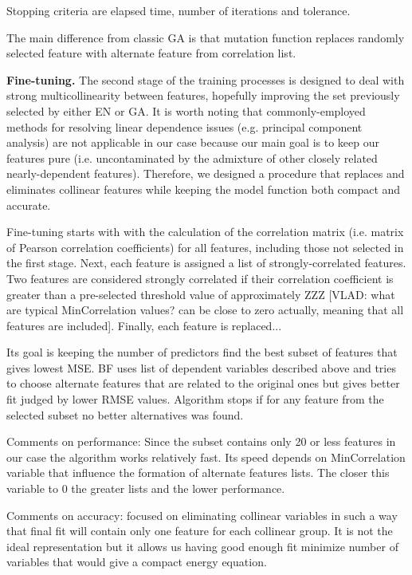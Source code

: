 \documentclass[aps,prl,reprint,amsmath,amssymb,nature]{revtex4-1}
\begin{document}
Stopping criteria are elapsed time, number of iterations and tolerance. 

The main difference from classic GA is that mutation function replaces randomly selected feature with alternate feature from correlation list. 

\textbf{Fine-tuning.} The second stage of the training processes is designed to deal with strong multicollinearity between features, hopefully improving the set previously selected by either EN or GA. 
It is worth noting that commonly-employed methods for resolving linear dependence issues (e.g. principal component analysis) are not applicable in our case because our main goal is to keep our features pure (i.e. uncontaminated by the admixture of other closely related nearly-dependent features). 
Therefore, we designed a procedure that replaces and eliminates collinear features while keeping the model function both compact and accurate. 

Fine-tuning starts with with the calculation of the correlation matrix (i.e. matrix of Pearson correlation coefficients) for all features, including those not selected in the first stage. 
Next, each feature is assigned a list of strongly-correlated features. Two features are considered strongly correlated if their correlation coefficient is greater than a pre-selected threshold value of approximately ZZZ [VLAD: what are typical MinCorrelation values? can be close to zero actually, meaning that all features are included].
Finally, each feature is replaced...

\red

Its goal is keeping the number of predictors find the best subset of features that gives lowest MSE. 
BF uses list of dependent variables described above and tries to choose alternate features that are related to the original ones but gives better fit judged by lower RMSE values. 
Algorithm stops if for any feature from the selected subset no better alternatives was found. 

Comments on performance: Since the subset contains only 20 or less features in our case the algorithm works relatively fast. Its speed depends on MinCorrelation variable that influence the formation of alternate features lists. The closer this variable to 0 the greater lists and the lower performance. 

Comments on accuracy: focused on eliminating collinear variables in such a way that final fit will contain only one feature for each collinear group. It is not the ideal representation but it allows us having good enough fit minimize number of variables that would give a compact energy equation. 
\end{document}
